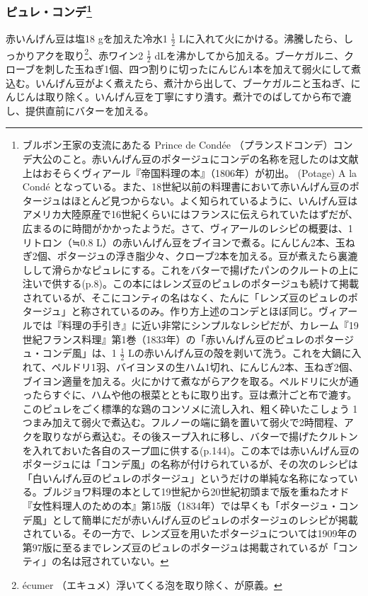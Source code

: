 \begin{recette}
{\subsubsection[ピュレ・コンデ]{\texorpdfstring{ピュレ・コンデ\footnote{ブルボン王家の支流にあたる
  Prince de Condée
  （プランスドコンデ）コンデ大公のこと。赤いんげん豆のポタージュにコンデの名称を冠したのは文献上はおそらくヴィアール『帝国料理の本』（1806年）が初出。
  (Potage) A la Condé
  となっている。また、18世紀以前の料理書において赤いんげん豆のポタージュはほとんど見つからない。よく知られているように、いんげん豆はアメリカ大陸原産で16世紀くらいにはフランスに伝えられていたはずだが、広まるのに時間がかかったようだ。さて、ヴィアールのレシピの概要は、1リトロン（≒0.8
  L）の赤いんげん豆をブイヨンで煮る。にんじん2本、玉ねぎ2個、ポタージュの浮き脂少々、クローブ2本を加える。豆が煮えたら裏漉しして滑らかなピュレにする。これをバターで揚げたパンのクルートの上に注いで供する(p.8)。この本にはレンズ豆のピュレのポタージュも続けて掲載されているが、そこにコンティの名はなく、たんに「レンズ豆のピュレのポタージュ」と称されているのみ。作り方上述のコンデとほぼ同じ。ヴィアールでは『料理の手引き』に近い非常にシンプルなレシピだが、カレーム『19世紀フランス料理』第1巻（1833年）の「赤いんげん豆のピュレのポタージュ・コンデ風」は、1
  \(\frac{1}{2}\)
  Lの赤いんげん豆の殻を剥いて洗う。これを大鍋に入れて、ペルドリ1羽、バイヨンヌの生ハム1切れ、にんじん2本、玉ねぎ2個、ブイヨン適量を加える。火にかけて煮ながらアクを取る。ペルドリに火が通ったらすぐに、ハムや他の根菜とともに取り出す。豆は煮汁ごと布で漉す。このピュレをごく標準的な鶏のコンソメに流し入れ、粗く砕いたこしょう
  1つまみ加えて弱火で煮込む。フルノーの端に鍋を置いて弱火で2時間程、アクを取りながら煮込む。その後スープ入れに移し、バターで揚げたクルトンを入れておいた各自のスープ皿に供する(p.144)。この本では赤いんげん豆のポタージュには「コンデ風」の名称が付けられているが、その次のレシピは「白いんげん豆のピュレのポタージュ」というだけの単純な名称になっている。ブルジョワ料理の本として19世紀から20世紀初頭まで版を重ねたオド『女性料理人のための本』第15版（1834年）では早くも「ポタージュ・コンデ風」として簡単にだが赤いんげん豆のピュレのポタージュのレシピが掲載されている。その一方で、レンズ豆を用いたポタージュについては1909年の第97版に至るまでレンズ豆のピュレのポタージュは掲載されているが「コンティ」の名は冠されていない。}}{ピュレ・コンデ}}\label{puree-conde}}


赤いんげん豆は塩18 gを加えた冷水1 \(\frac{1}{2}\)
Lに入れて火にかける。沸騰したら、しっかりアクを取り\footnote{écumer
  （エキュメ）浮いてくる泡を取り除く、が原義。}、赤ワイン2
\(\frac{1}{2}\)
dLを沸かしてから加える。ブーケガルニ、クローブを刺した玉ねぎ1個、四つ割りに切ったにんじん1本を加えて弱火にして煮込む。いんげん豆がよく煮えたら、煮汁から出して、ブーケガルニと玉ねぎ、にんじんは取り除く。いんげん豆を丁寧にすり潰す。煮汁でのばしてから布で漉し、提供直前にバターを加える。


\end{recette}
